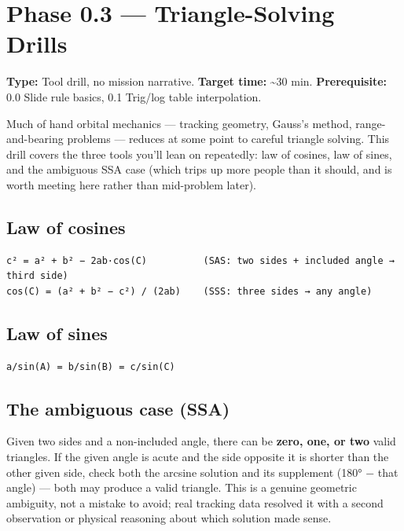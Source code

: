 \documentclass[
  10pt,
]{article}
\author{}
\date{}
\begin{document}
\hypertarget{phase-0.3-triangle-solving-drills}{%
\section{Phase 0.3 --- Triangle-Solving
Drills}\label{phase-0.3-triangle-solving-drills}}

\textbf{Type:} Tool drill, no mission narrative. \textbf{Target time:}
\textasciitilde30 min. \textbf{Prerequisite:} 0.0 Slide rule basics, 0.1
Trig/log table interpolation.

Much of hand orbital mechanics --- tracking geometry, Gauss's method,
range- and-bearing problems --- reduces at some point to careful
triangle solving. This drill covers the three tools you'll lean on
repeatedly: law of cosines, law of sines, and the ambiguous SSA case
(which trips up more people than it should, and is worth meeting here
rather than mid-problem later).

\hypertarget{law-of-cosines}{%
\subsection{Law of cosines}\label{law-of-cosines}}

\begin{verbatim}
c² = a² + b² − 2ab·cos(C)          (SAS: two sides + included angle → third side)
cos(C) = (a² + b² − c²) / (2ab)    (SSS: three sides → any angle)
\end{verbatim}

\hypertarget{law-of-sines}{%
\subsection{Law of sines}\label{law-of-sines}}

\begin{verbatim}
a/sin(A) = b/sin(B) = c/sin(C)
\end{verbatim}

\hypertarget{the-ambiguous-case-ssa}{%
\subsection{The ambiguous case (SSA)}\label{the-ambiguous-case-ssa}}

Given two sides and a non-included angle, there can be \textbf{zero,
one, or two} valid triangles. If the given angle is acute and the side
opposite it is shorter than the other given side, check both the arcsine
solution and its supplement (180° − that angle) --- both may produce a
valid triangle. This is a genuine geometric ambiguity, not a mistake to
avoid; real tracking data resolved it with a second observation or
physical reasoning about which solution made sense.
\end{document}
